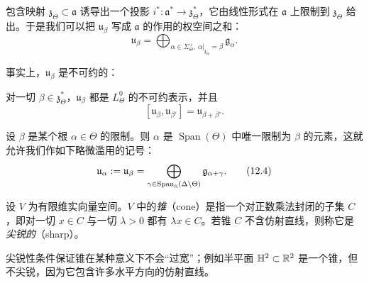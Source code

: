 包含映射 $\mathfrak{z}_\Theta\subset\mathfrak{a}$ 诱导出一个投影 $i^*:\mathfrak{a}^*\to\mathfrak{z}_\Theta^*$，它由线性形式在 $\mathfrak{a}$ 上限制到 $\mathfrak{z}_\Theta$ 给出。于是我们可以把 $\mathfrak{u}_\beta$ 写成 $\mathfrak{a}$ 的作用的权空间之和：
\[
\mathfrak{u}_\beta=\bigoplus_{\alpha\in\Sigma_\Theta^+,\ \alpha|_{\mathfrak{z}_\Theta}=\beta}\mathfrak{g}_\alpha.
\]

事实上，$\mathfrak{u}_\beta$ 是不可约的：

\begin{theorem}[12.12（{{{{{[240, Thm. 0.1]}}}}}）]
对一切 $\beta\in\mathfrak{z}_\Theta^*$，$\mathfrak{u}_\beta$ 都是 $L_\Theta^0$ 的不可约表示，并且
\[
[\mathfrak{u}_\beta,\mathfrak{u}_{\beta'}]=\mathfrak{u}_{\beta+\beta'}.
\]
\end{theorem}


设 $\beta$ 是某个根 $\alpha\in\Theta$ 的限制。则 $\alpha$ 是 $\operatorname{Span}(\Theta)$ 中唯一限制为 $\beta$ 的元素，这就允许我们作如下略微滥用的记号：
\begin{equation}
\mathfrak{u}_\alpha:=\mathfrak{u}_\beta=\bigoplus_{\gamma\in\operatorname{Span}_{\mathbb{N}}(\Delta\setminus\Theta)}\mathfrak{g}_{\alpha+\gamma}.
\tag{12.4}
\end{equation}

\begin{definition}[12.13]
设 $V$ 为有限维实向量空间。$V$ 中的\emph{锥}（cone）是指一个对正数乘法封闭的子集 $C$，即对一切 $x\in C$ 与一切 $\lambda>0$ 都有 $\lambda x\in C$。若锥 $C$ 不含仿射直线，则称它是\emph{尖锐的}（sharp）。
\end{definition}

\begin{remark}[12.14]
尖锐性条件保证锥在某种意义下不会“过宽”；例如半平面 $\mathbb{H}^2\subset\mathbb{R}^2$ 是一个锥，但不尖锐，因为它包含许多水平方向的仿射直线。
\end{remark}


